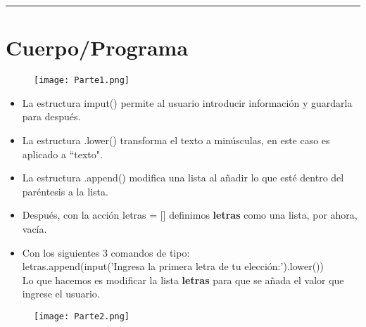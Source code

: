 \documentclass[15pt]{article}
\begin{document}
\hspace{-15pt}\textcolor{Blue}{\rule{18.5cm}{1pt}}

\vspace{15pt}
\section*{\Large{Cuerpo/Programa}}

\begin{figure}[h]
\centering
\texttt{[image: Parte1.png]}
\end{figure}

\begin{itemize}

    \item La estructura imput() permite al usuario introducir información y guardarla para después.
    \item La estructura .lower() transforma el texto a minúsculas, en este caso es aplicado a ``texto".
    \item La estructura .append() modifica una lista al añadir lo que esté dentro del paréntesis a la lista.
    \item Después, con la acción letras = [] definimos \textbf{letras} como una lista, por ahora, vacía.
    \item Con los siguientes 3 comandos de tipo:\\
    
    letras.append(input('Ingresa la primera letra de tu elección:').lower())\\
    
    Lo que hacemos es modificar la lista \textbf{letras} para que se añada el valor que ingrese el usuario.

\end{itemize}

\newpage

\begin{figure}[h]
\centering
\texttt{[image: Parte2.png]}
\end{figure}
\end{document}
